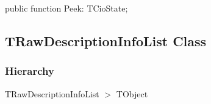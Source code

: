 \documentclass{report}
\newif\ifpdf
\begin{document}
\label{PasDoc_Parser.TCioStateStack-Peek}
\begin{list}{}{
\setlength{\itemindent}{0cm}
\setlength{\listparindent}{0cm}
\setlength{\leftmargin}{\evensidemargin}
\addtolength{\leftmargin}{\tmplength}
\settowidth{\labelsep}{X}
\addtolength{\leftmargin}{\labelsep}
\setlength{\labelwidth}{\tmplength}
}
\item[\textbf{Declaration}\hfill]
\ifpdf
\begin{flushleft}
\fi
\begin{ttfamily}
public function Peek: TCioState;\end{ttfamily}

\ifpdf
\end{flushleft}
\fi

\end{list}
\ifpdf
\subsection*{\large{\textbf{TRawDescriptionInfoList Class}}\normalsize\hspace{1ex}\hrulefill}
\else
\subsection*{TRawDescriptionInfoList Class}
\fi
\label{PasDoc_Parser.TRawDescriptionInfoList}
\subsubsection*{\large{\textbf{Hierarchy}}\normalsize\hspace{1ex}\hfill}
TRawDescriptionInfoList {$>$} TObject
\end{document}
